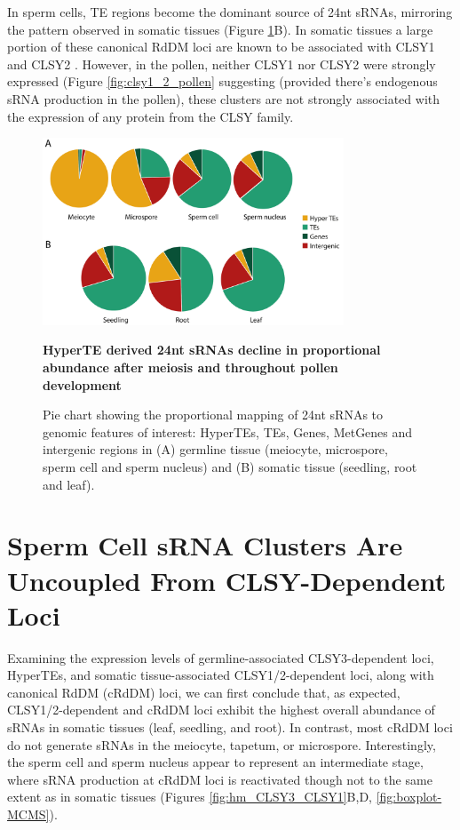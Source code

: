 In sperm cells, TE regions become the dominant source of 24nt sRNAs, mirroring the pattern observed in somatic tissues (Figure \ref{fig:sRNA_pie}B). In somatic tissues a large portion of these canonical RdDM loci are known to be associated with CLSY1 and CLSY2 \cite{RN23}. However, in the pollen, neither CLSY1 nor CLSY2 were strongly expressed (Figure \ref{fig:clsy1_2_pollen} suggesting (provided there's endogenous sRNA production in the pollen), these clusters are not strongly associated with the expression of any protein from the CLSY family.

\begin{figure}[htbp!] 
\centering    
    \includegraphics[width=0.8\textwidth]{Chapter2/Figs/Figure7_Pie_charts.pdf}
\caption{\textbf{HyperTE derived 24nt sRNAs decline in proportional abundance after meiosis and throughout pollen development}}
\label{fig:sRNA_pie}
\captionsetup{font=small}
    \caption*{Pie chart showing the proportional mapping of 24nt sRNAs to genomic features of interest: HyperTEs, TEs, Genes, MetGenes and intergenic regions in (A) germline tissue (meiocyte, microspore, sperm cell and sperm nucleus) and (B) somatic tissue (seedling, root and leaf).}
\end{figure}

\section{Sperm Cell sRNA Clusters Are Uncoupled From CLSY-Dependent Loci}

Examining the expression levels of germline-associated CLSY3-dependent loci, HyperTEs, and somatic tissue-associated CLSY1/2-dependent loci, along with canonical RdDM (cRdDM) loci, we can first conclude that, as expected, CLSY1/2-dependent and cRdDM loci exhibit the highest overall abundance of sRNAs in somatic tissues (leaf, seedling, and root). In contrast, most cRdDM loci do not generate sRNAs in the meiocyte, tapetum, or microspore. Interestingly, the sperm cell and sperm nucleus appear to represent an intermediate stage, where sRNA production at cRdDM loci is reactivated though not to the same extent as in somatic tissues (Figures \ref{fig:hm_CLSY3_CLSY1}B,D, \ref{fig:boxplot-MCMS}).

